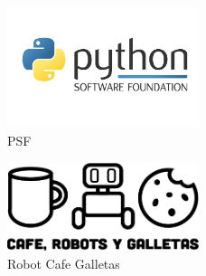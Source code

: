 \documentclass[
  letterpaper,
  DIV=11,
  numbers=noendperiod]{scrartcl}
\begin{document}
\begin{figure}[H]

{\centering \includegraphics[width=0.5\textwidth,height=\textheight]{./images/PSF.png}

}

\caption{PSF}

\end{figure}%

\begin{figure}[H]

{\centering \includegraphics[width=0.5\textwidth,height=\textheight]{./images/cafe_robots_galletas.png}

}

\caption{Robot Cafe Galletas}

\end{figure}%
\end{document}
